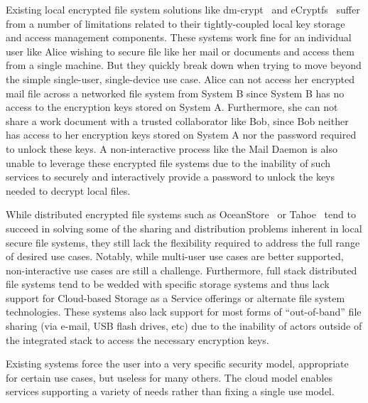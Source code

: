 Existing local encrypted file system solutions like
dm-crypt~\cite{dm-crypt} and eCryptfs~\cite{Halcrow} suffer from a
number of limitations related to their tightly-coupled local key
storage and access management components. These systems work fine for an
individual user like Alice wishing to secure file like her mail or
documents and access them from a single machine. But they quickly
break down when trying to move beyond the simple single-user,
single-device use case. Alice can not access her encrypted mail file
across a networked file system from System B since System B has no
access to the encryption keys stored on System A. Furthermore, she can
not share a work document with a trusted collaborator like Bob,
since Bob neither has access to her encryption keys stored on System A
nor the password required to unlock these keys. A non-interactive
process like the Mail Daemon is also unable to leverage these
encrypted file systems due to the inability of such services to
securely and interactively provide a password to unlock the keys
needed to decrypt local files.


While distributed encrypted file systems such as
OceanStore~\cite{Kubiatowicz2000} or Tahoe~\cite{Wilcox-O'Hearn2008}
tend to succeed in solving some of the sharing and distribution
problems inherent in local secure file systems, they still lack the
flexibility required to address the full range of desired use
cases. 
Notably, while multi-user
use cases are better supported, non-interactive use cases are still a
challenge. Furthermore, full stack distributed file systems tend to be
wedded with specific storage systems and thus lack support for
Cloud-based Storage as a Service offerings or alternate file system
technologies. These systems also lack support for most forms of
``out-of-band'' file sharing (via e-mail, USB flash drives, etc) due
to the inability of actors outside of the integrated stack to access
the necessary encryption keys.

Existing systems force the user into a very specific security model,
appropriate for certain use cases, but useless for many others. 
The cloud model enables services supporting a variety of needs 
rather than fixing a single use model.

